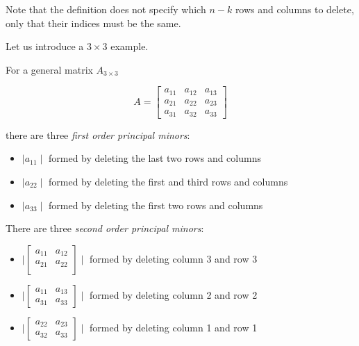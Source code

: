 \documentclass[12pt,openright,twoside,a4paper]{book}
\begin{document}
Note that the definition does not specify which $n-k$ rows and columns to delete, only that their indices must be the same.

Let us introduce a $3 \times 3$ example.

For a general matrix $A_{3\times 3}$ 

\begin{equation}
A=
\begin{bmatrix}
         a_{11} & a_{12} & a_{13} \\
    	    a_{21} & a_{22} & a_{23} \\ 
	    a_{31} & a_{32} & a_{33}  
\end{bmatrix}
\end{equation}

\vspace{5mm}

there are three \textit{first order principal minors}:

\begin{itemize}
\item $\mid a_{11}\mid$ formed by deleting the last two rows and columns
\item $\mid a_{22}\mid$ formed by deleting the first and third rows and columns
\item $\mid a_{33}\mid$ formed by deleting the first two rows and columns

\end{itemize}

There are three \textit{second order principal minors}:

\begin{itemize}
\item 
$\mid\begin{bmatrix}
         a_{11} & a_{12}  \\
    	    a_{21} & a_{22}  \\ 
\end{bmatrix}\mid$ formed by deleting column 3 and row 3

\item
$\mid\begin{bmatrix}
         a_{11}  & a_{13} \\
	    a_{31}  & a_{33}  
\end{bmatrix}\mid$ formed by deleting column 2 and row 2

\item
$\mid\begin{bmatrix}
         a_{22} & a_{23} \\ 
	     a_{32} & a_{33}  
\end{bmatrix}\mid$ formed by deleting column 1 and row 1

\end{itemize}
\end{document}
